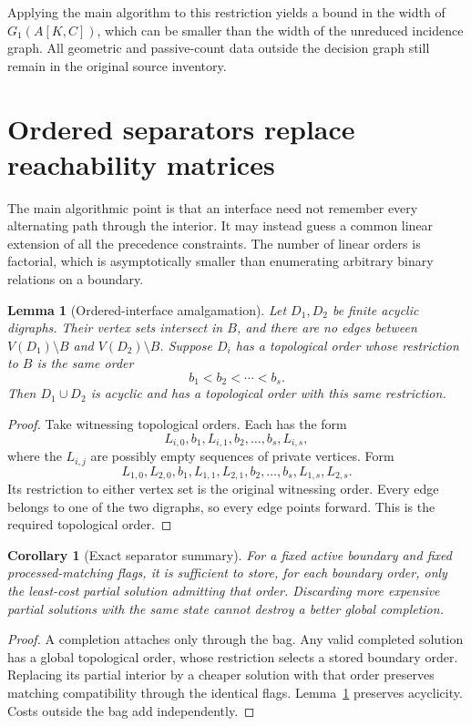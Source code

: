 \documentclass[11pt]{article}
\newtheorem{lemma}[theorem]{Lemma}
\newtheorem{corollary}[theorem]{Corollary}
\theoremstyle{definition}\newtheorem{definition}[theorem]{Definition}
\theoremstyle{remark}\newtheorem{remark}[theorem]{Remark}
\begin{document}
Applying the main algorithm to this restriction yields a bound in the width of $G_1(A[K,C])$, which can be smaller than the width of the unreduced incidence graph. All geometric and passive-count data outside the decision graph still remain in the original source inventory.

\section{Ordered separators replace reachability matrices}
\label{sec:amalgamation}

The main algorithmic point is that an interface need not remember every alternating path through the interior. It may instead guess a common linear extension of all the precedence constraints. The number of linear orders is factorial, which is asymptotically smaller than enumerating arbitrary binary relations on a boundary.

\begin{lemma}[Ordered-interface amalgamation]
\label{lem:amalgamation}
Let $D_1,D_2$ be finite acyclic digraphs. Their vertex sets intersect in $B$, and there are no edges between $V(D_1)\setminus B$ and $V(D_2)\setminus B$. Suppose $D_i$ has a topological order whose restriction to $B$ is the same order
\[
 b_1<b_2<\cdots<b_s.
\]
Then $D_1\cup D_2$ is acyclic and has a topological order with this same restriction.
\end{lemma}
\begin{proof}
Take witnessing topological orders. Each has the form
\[
 L_{i,0},b_1,L_{i,1},b_2,\ldots,b_s,L_{i,s},
\]
where the $L_{i,j}$ are possibly empty sequences of private vertices. Form
\[
 L_{1,0},L_{2,0},b_1,L_{1,1},L_{2,1},b_2,
 \ldots,b_s,L_{1,s},L_{2,s}.
\]
Its restriction to either vertex set is the original witnessing order. Every edge belongs to one of the two digraphs, so every edge points forward. This is the required topological order.
\end{proof}

\begin{corollary}[Exact separator summary]
\label{cor:summary}
For a fixed active boundary and fixed processed-matching flags, it is sufficient to store, for each boundary order, only the least-cost partial solution admitting that order. Discarding more expensive partial solutions with the same state cannot destroy a better global completion.
\end{corollary}
\begin{proof}
A completion attaches only through the bag. Any valid completed solution has a global topological order, whose restriction selects a stored boundary order. Replacing its partial interior by a cheaper solution with that order preserves matching compatibility through the identical flags. Lemma~\ref{lem:amalgamation} preserves acyclicity. Costs outside the bag add independently.
\end{proof}
\end{document}

